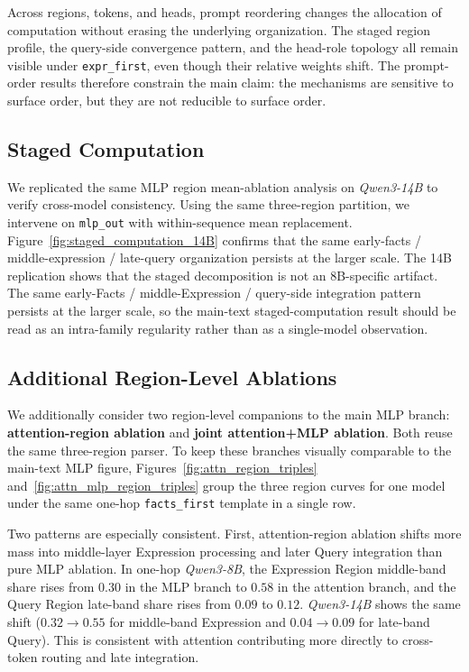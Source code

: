 \documentclass[11pt]{article}
\begin{document}
Across regions, tokens, and heads, prompt reordering changes the allocation of computation without erasing the underlying organization. The staged region profile, the query-side convergence pattern, and the head-role topology all remain visible under \texttt{expr\_first}, even though their relative weights shift. The prompt-order results therefore constrain the main claim: the mechanisms are sensitive to surface order, but they are not reducible to surface order.

\subsection{Staged Computation}
\label{sec:appendix_stage}
We replicated the same MLP region mean-ablation analysis on \textit{Qwen3-14B} to verify cross-model consistency. Using the same three-region partition, we intervene on \texttt{mlp\_out} with within-sequence mean replacement. Figure~\ref{fig:staged_computation_14B} confirms that the same early-facts / middle-expression / late-query organization persists at the larger scale.
The 14B replication shows that the staged decomposition is not an 8B-specific artifact. The same early-Facts / middle-Expression / query-side integration pattern persists at the larger scale, so the main-text staged-computation result should be read as an intra-family regularity rather than as a single-model observation.

\subsection{Additional Region-Level Ablations}
\label{sec:appendix_region_variants}
We additionally consider two region-level companions to the main MLP branch: \textbf{attention-region ablation} and \textbf{joint attention+MLP ablation}. Both reuse the same three-region parser. To keep these branches visually comparable to the main-text MLP figure, Figures~\ref{fig:attn_region_triples} and~\ref{fig:attn_mlp_region_triples} group the three region curves for one model under the same one-hop \texttt{facts\_first} template in a single row.

Two patterns are especially consistent. First, attention-region ablation shifts more mass into middle-layer Expression processing and later Query integration than pure MLP ablation. In one-hop \textit{Qwen3-8B}, the Expression Region middle-band share rises from $0.30$ in the MLP branch to $0.58$ in the attention branch, and the Query Region late-band share rises from $0.09$ to $0.12$. \textit{Qwen3-14B} shows the same shift ($0.32 \rightarrow 0.55$ for middle-band Expression and $0.04 \rightarrow 0.09$ for late-band Query). This is consistent with attention contributing more directly to cross-token routing and late integration.
\end{document}
